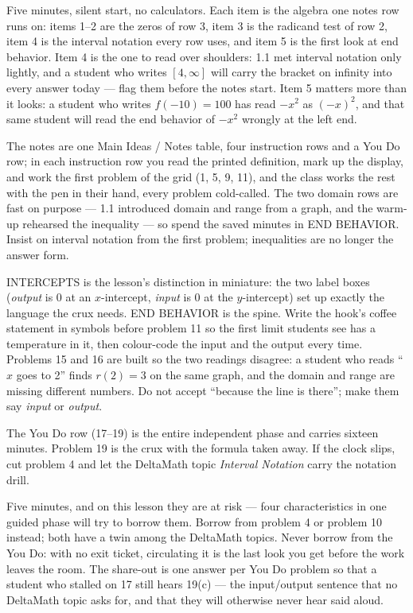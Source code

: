 \documentclass[10pt]{article}
\begin{document}
\begin{teachernote}[Warm-Up]
Five minutes, silent start, no calculators. Each item is the algebra one notes row runs on:
items 1--2 are the zeros of row 3, item 3 is the radicand test of row 2, item 4 is the
interval notation every row uses, and item 5 is the first look at end behavior. Item 4 is the
one to read over shoulders: 1.1 met interval notation only lightly, and a student who writes
$[4, \infty]$ will carry the bracket on infinity into every answer today --- flag them before
the notes start. Item 5 matters more than it looks: a student who writes $f(-10) = 100$ has
read $-x^2$ as $(-x)^2$, and that same student will read the end
behavior of $-x^2$ wrongly at the left end.
\end{teachernote}

\begin{teachernote}
The notes are one Main Ideas / Notes table, four instruction rows and a You Do row; in each
instruction row you read the printed definition, mark up the display, and work the first
problem of the grid (1, 5, 9, 11), and the class works the rest with the pen in their hand,
every problem cold-called. The two domain rows are fast on purpose --- 1.1 introduced domain and
range from a graph, and the warm-up rehearsed the inequality --- so spend the saved minutes in
END BEHAVIOR. Insist on interval notation from the first problem; inequalities are no longer the
answer form.

INTERCEPTS is the lesson's distinction in miniature: the two label boxes (\textit{output} is 0
at an $x$-intercept, \textit{input} is 0 at the $y$-intercept) set up exactly the language the
crux needs. END BEHAVIOR is the spine. Write the hook's coffee statement in symbols before
problem 11 so the first limit students see has a temperature in it, then colour-code the input
and the output every time. Problems 15 and 16 are built so the two readings disagree: a
student who reads ``$x$ goes to 2'' finds $r(2) = 3$ on the same graph, and the domain and range
are missing different numbers. Do not accept ``because the line is there''; make them say
\textit{input} or \textit{output}.

The You Do row (17--19) is the entire independent phase and carries sixteen minutes. Problem
19 is the crux with the formula taken away. If the clock slips, cut problem 4 and let the
DeltaMath topic \textit{Interval Notation} carry the notation drill.
\end{teachernote}

\begin{teachernote}[Debrief]
Five minutes, and on this lesson they are at risk --- four characteristics in one guided phase
will try to borrow them. Borrow from problem 4 or problem 10 instead; both have a twin among
the DeltaMath topics. Never borrow from the You Do: with no exit ticket, circulating it is the
last look you get before the work leaves the room. The share-out is one answer per You Do
problem so that a student who stalled on 17 still hears 19(c) --- the input/output sentence
that no DeltaMath topic asks for, and that they will otherwise never hear said aloud.
\end{teachernote}
\end{document}
